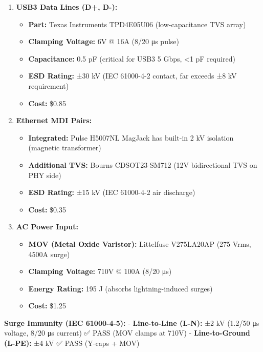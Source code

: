 \documentclass[
]{article}
\providecommand{\tightlist}{%
  \setlength{\itemsep}{0pt}\setlength{\parskip}{0pt}}
\begin{document}
\begin{enumerate}
\def\labelenumi{\arabic{enumi}.}
\tightlist
\item
  \textbf{USB3 Data Lines (D+, D-):}

  \begin{itemize}
  \tightlist
  \item
    \textbf{Part:} Texas Instruments TPD4E05U06 (low-capacitance TVS
    array)
  \item
    \textbf{Clamping Voltage:} 6V @ 16A (8/20 μs pulse)
  \item
    \textbf{Capacitance:} 0.5 pF (critical for USB3 5 Gbps, \textless1
    pF required)
  \item
    \textbf{ESD Rating:} ±30 kV (IEC 61000-4-2 contact, far exceeds ±8
    kV requirement)
  \item
    \textbf{Cost:} \$0.85
  \end{itemize}
\item
  \textbf{Ethernet MDI Pairs:}

  \begin{itemize}
  \tightlist
  \item
    \textbf{Integrated:} Pulse H5007NL MagJack has built-in 2 kV
    isolation (magnetic transformer)
  \item
    \textbf{Additional TVS:} Bourns CDSOT23-SM712 (12V bidirectional TVS
    on PHY side)
  \item
    \textbf{ESD Rating:} ±15 kV (IEC 61000-4-2 air discharge)
  \item
    \textbf{Cost:} \$0.35
  \end{itemize}
\item
  \textbf{AC Power Input:}

  \begin{itemize}
  \tightlist
  \item
    \textbf{MOV (Metal Oxide Varistor):} Littelfuse V275LA20AP (275
    Vrms, 4500A surge)
  \item
    \textbf{Clamping Voltage:} 710V @ 100A (8/20 μs)
  \item
    \textbf{Energy Rating:} 195 J (absorbs lightning-induced surges)
  \item
    \textbf{Cost:} \$1.25
  \end{itemize}
\end{enumerate}

\textbf{Surge Immunity (IEC 61000-4-5):} - \textbf{Line-to-Line (L-N):}
±2 kV (1.2/50 μs voltage, 8/20 μs current) ✅ PASS (MOV clamps at 710V)
- \textbf{Line-to-Ground (L-PE):} ±4 kV ✅ PASS (Y-caps + MOV)
\end{document}

